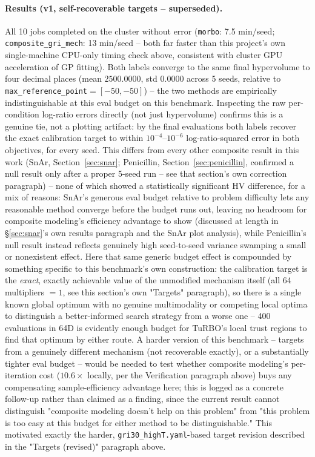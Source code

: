\documentclass[11pt]{article}
\begin{document}
\paragraph{Results (v1, self-recoverable targets -- superseded).} All 10
jobs completed on the cluster without error
(\texttt{morbo}: 7.5 min/seed; \texttt{composite\_gri\_mech}: 13 min/seed
-- both far faster than this project's own single-machine CPU-only
timing check above, consistent with cluster GPU acceleration of GP
fitting). Both labels converge to the same final hypervolume to four
decimal places (mean $2500.0000$, std $0.0000$ across 5 seeds, relative
to \texttt{max\_reference\_point}$=[-50,-50]$) -- the two methods are
empirically indistinguishable at this eval budget on this benchmark.
Inspecting the raw per-condition log-ratio errors directly (not just
hypervolume) confirms this is a genuine tie, not a plotting artifact:
by the final evaluations both labels recover the exact calibration
target to within $10^{-4}$--$10^{-6}$ log-ratio-squared error in both
objectives, for every seed. This differs from every other composite
result in this work (SnAr, Section~\ref{sec:snar}; Penicillin,
Section~\ref{sec:penicillin}, confirmed a null result only after a
proper 5-seed run -- see that section's own correction paragraph) --
none of which showed a statistically significant HV difference, for a
mix of reasons: SnAr's generous eval budget relative to problem
difficulty lets any reasonable method converge before the budget runs
out, leaving no headroom for composite modeling's efficiency advantage
to show (discussed at length in \S\ref{sec:snar}'s own results
paragraph and the SnAr plot analysis), while Penicillin's null result
instead reflects genuinely high seed-to-seed variance swamping a small
or nonexistent effect. Here that same generic budget
effect is compounded by something specific to this benchmark's own
construction: the calibration target is the \emph{exact}, exactly
achievable value of the unmodified mechanism itself (all 64 multipliers
$=1$, see this section's own "Targets" paragraph), so there is a single
known global optimum with no genuine multimodality or competing local
optima to distinguish a better-informed search strategy from a worse one
-- 400 evaluations in 64D is evidently enough budget for TuRBO's local
trust regions to find that optimum by either route. A harder version of
this benchmark -- targets from a genuinely different mechanism (not
recoverable exactly), or a substantially tighter eval budget -- would be
needed to test whether composite modeling's per-iteration cost
($10.6\times$ locally, per the Verification paragraph above) buys any
compensating sample-efficiency advantage here; this is logged as a
concrete follow-up rather than claimed as a finding, since the current
result cannot distinguish "composite modeling doesn't help on this
problem" from "this problem is too easy at this budget for either
method to be distinguishable." This motivated exactly the harder,
\texttt{gri30\_highT.yaml}-based target revision described in the
"Targets (revised)" paragraph above.
\end{document}
